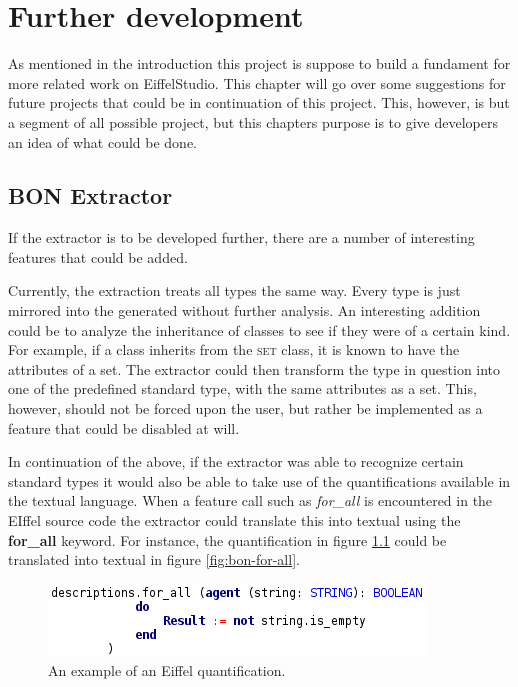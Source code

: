 \chapter{Further development}
As mentioned in the introduction this project is suppose to build a fundament for more \bon{} related work on EiffelStudio. This chapter will go over some suggestions for future projects that could be in continuation of this project. This, however, is but a segment of all possible project, but this chapters purpose is to give developers an idea of what could be done.
\section{BON Extractor}
If the \bon{} extractor is to be developed further, there are a number of interesting features that could be added. 

Currently, the \bon{} extraction treats all types the same way. Every type is just mirrored into the generated \bon{} without further analysis. An interesting addition could be to analyze the inheritance of classes to see if they were of a certain kind. For example, if a class inherits from the \textsc{set} class, it is known to have the attributes of a set. The extractor could then transform the type in question into one of the predefined standard type, with the same attributes as a set. This, however, should not be forced upon the user, but rather be implemented as a feature that could be disabled at will.

In continuation of the above, if the extractor was able to recognize certain standard types it would also be able to take use of the quantifications available in the textual \bon{} language. When a feature call such as \textit{for\_all} is encountered in the EIffel source code the extractor could translate this into textual \bon{} using the \textbf{for\_all} keyword. For instance, the quantification in figure \ref{fig:agent-for-all} could be translated into textual \bon{} in figure \ref{fig:bon-for-all}.
\begin{figure}[h]
\centerline{
\includegraphics[scale=0.7]{images/agent_example.png} 
}
\caption{An example of an Eiffel quantification.}
\label{fig:agent-for-all}
\end{figure}


